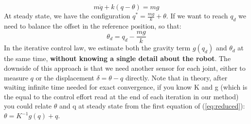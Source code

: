 \[
    m\ddot q + k(q-\theta) = mg
\]
At steady state, we have the configuration \(q^* = \frac{mg}{k} +\theta\). If we want to reach \(q_d\) we need to balance the offset in the reference position, so that:
\[
    \theta_d = q_d - \frac{mg}{k}
\]
In the iterative control law, we estimate both the gravity term \(g(q_d)\) and \(\theta_d\) at the same time, \textbf{without knowing a single detail about the robot}. The downside of this approach is that we need another sensor for each joint, either to measure \(q\) or the displacement \(\delta = \theta - q\) directly. Note that in theory, after waiting infinite time needed for exact convergence, if you know K and g (which is the equal to the control effort read at the end of each iteration in our method) you could relate $\theta$ and q at steady state from the first equation of (\ref{eq:reduced}): $\theta = K^{-1}g(q)+q$.
